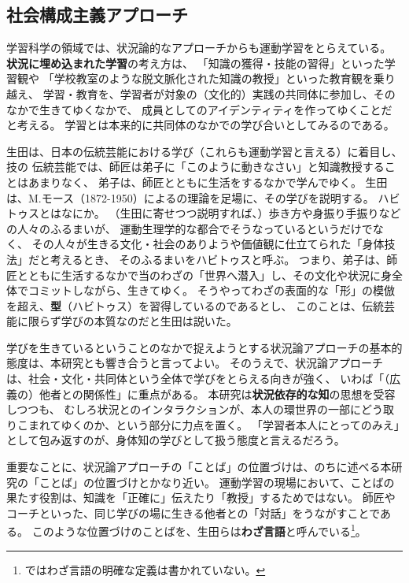 \subsection{社会構成主義アプローチ}
学習科学の領域では、状況論的なアプローチからも運動学習をとらえている。
\textbf{状況に埋め込まれた学習}\cite{lave_and_wenger:1991}の考え方は、
「知識の獲得・技能の習得」といった学習観や
「学校教室のような脱文脈化された知識の教授」といった教育観を乗り越え、
学習・教育を、学習者が対象の（文化的）実践の共同体に参加し、そのなかで生きてゆくなかで、
成員としてのアイデンティティを作ってゆくことだと考える。
学習とは本来的に共同体のなかでの学び合いとしてみるのである。

生田\cite{ikuta:2007}は、日本の伝統芸能における学び（これらも運動学習と言える）に着目し、技の
伝統芸能では、師匠は弟子に「このように動きなさい」と知識教授することはあまりなく、
弟子は、師匠とともに生活をするなかで学んでゆく。
生田は、M.モース（1872-1950）によるの理論を足場に、その学びを説明する。
ハビトゥスとはなにか。
（生田に寄せつつ説明すれば、）歩き方や身振り手振りなどの人々のふるまいが、
運動生理学的な都合でそうなっているというだけでなく、
その人々が生きる文化・社会のありようや価値観に仕立てられた「身体技法」だと考えるとき、
そのふるまいをハビトゥスと呼ぶ。
つまり、弟子は、師匠とともに生活するなかで当のわざの「世界へ潜入」し、その文化や状況に身全体でコミットしながら、生きてゆく。
そうやってわざの表面的な「形」の模倣を超え、\textbf{型}（ハビトゥス）を習得しているのであるとし、
このことは、伝統芸能に限らず学びの本質なのだと生田は説いた。

学びを生きているということのなかで捉えようとする状況論アプローチの基本的態度は、本研究とも響き合うと言ってよい。
そのうえで、状況論アプローチは、社会・文化・共同体という全体で学びをとらえる向きが強く、
いわば「（広義の）他者との関係性」に重点がある。
本研究は\textbf{状況依存的な知}\cite{clancey:1997}の思想を受容しつつも、
むしろ状況とのインタラクションが、本人の環世界の一部にどう取りこまれてゆくのか、という部分に力点を置く。
「学習者本人にとってのみえ」として包み返すのが、身体知の学びとして扱う態度と言えるだろう。

重要なことに、状況論アプローチの「ことば」の位置づけは、のちに述べる本研究の「ことば」の位置づけとかなり近い。
運動学習の現場において、ことばの果たす役割は、知識を「正確に」伝えたり「教授」するためではない。
師匠やコーチといった、同じ学びの場に生きる他者との「対話」をうながすことである。
このような位置づけのことばを、生田らは\textbf{わざ言語}\cite{ikuta:2011}と呼んでいる\footnote{
\cite{ikuta:2011}ではわざ言語の明確な定義は書かれていない。
}。

